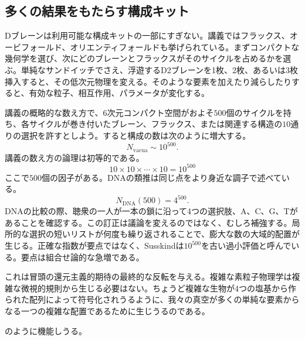 \subsection{多くの結果をもたらす構成キット}

Dブレーンは利用可能な構成キットの一部にすぎない。講義ではフラックス、オービフォールド、オリエンティフォールドも挙げられている。まずコンパクトな幾何学を選び、次にどのブレーンとフラックスがそのサイクルを占めるかを選ぶ。単純なサンドイッチでさえ、浮遊するD2ブレーンを1枚、2枚、あるいは3枚挿入すると、その低次元物理を変える。そのような要素を加えたり減らしたりすると、有効な粒子、相互作用、パラメータが変化する。

講義の概略的な数え方で、6次元コンパクト空間がおよそ\(500\)個のサイクルを持ち、各サイクルが巻き付いたブレーン、フラックス、または関連する構造の\(10\)通りの選択を許すとしよう。すると構成の数は次のように増大する。
\begin{equation}
N_{\mathrm{vacua}} \sim 10^{500}.
\end{equation}
講義の数え方の論理は初等的である。
\begin{equation}
10 \times 10 \times \cdots \times 10 = 10^{500}
\end{equation}
ここで\(500\)個の因子がある。DNAの類推は同じ点をより身近な調子で述べている。
\begin{equation}
N_{\mathrm{DNA}}(500)=4^{500}.
\end{equation}
DNAの比較の際、聴衆の一人が一本の鎖に沿って4つの選択肢、A、C、G、Tがあることを確認する。この訂正は議論を変えるのではなく、むしろ補強する。局所的な選択の短いリストが何度も繰り返されることで、膨大な数の大域的配置が生じる。正確な指数が要点ではなく、Susskindは\(10^{500}\)を古い過小評価と呼んでいる。要点は組合せ論的な急増である。

これは冒頭の還元主義的期待の最終的な反転を与える。複雑な素粒子物理学は複雑な微視的規則から生じる必要はない。ちょうど複雑な生物が4つの塩基から作られた配列によって符号化されうるように、我々の真空が多くの単純な要素からなる一つの複雑な配置であるために生じうるのである。

\begin{classroomqa}
のように機能しうる。\end{classroomqa}


